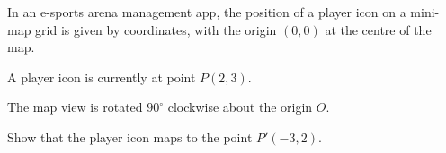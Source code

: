 \begin{question}
\noindent In an e-sports arena management app, the position of a player icon on a mini-map grid is given by coordinates, with the origin $(0,0)$ at the centre of the map.

\noindent A player icon is currently at point $P(2,3)$.

\noindent The map view is rotated $90^\circ$ clockwise about the origin $O$.

\noindent Show that the player icon maps to the point $P'(-3,2)$.

\vspace{4cm}

\end{question}
